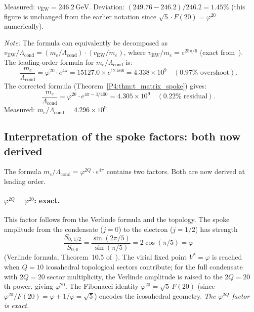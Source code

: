 \documentclass[11pt,a4paper]{article}
\theoremstyle{definition}
\theoremstyle{remark}
\newcommand{\vp}{\varphi}
\newcommand{\vEW}{v_{\mathrm{EW}}}
\newcommand{\Lcond}{\Lambda_{\mathrm{cond}}}
\begin{document}
Measured: $\vEW = 246.2\,\mathrm{GeV}$.  Deviation: $(249.76-246.2)/246.2 = 1.45\%$
(this figure is unchanged from the earlier notation since
$\sqrt{5}\cdot F(20) = \vp^{20}$ numerically).

\medskip
\noindent
\textit{Note:} The formula can equivalently be decomposed as
$v_\text{EW}/\Lcond = (m_e/\Lcond)\cdot(v_\text{EW}/m_e)$, where
$v_\text{EW}/m_e = e^{25\pi/6}$ (exact from~\cite{Paper1}).
The leading-order formula for $m_e/\Lcond$ is:
\begin{equation}
  \frac{m_e}{\Lcond} = \vp^{20}\cdot e^{4\pi}
  = 15127.0\times e^{12.566}
  = 4.338\times10^9 \quad(0.97\%\text{ overshoot}).
  \label{P4:eq:me_formula}
\end{equation}
The corrected formula (Theorem~\ref{P4:thm:t_matrix_spoke}) gives:
\begin{equation}
  \frac{m_e}{\Lcond} = \vp^{20}\cdot e^{4\pi-3/400}
  = 4.305\times10^9 \quad(0.22\%\text{ residual}).
  \label{P4:eq:me_formula_corrected}
\end{equation}
Measured: $m_e/\Lcond = 4.296\times10^9$.

\subsection{Interpretation of the spoke factors: both now derived}
\label{P4:sec:spoke_factors}

The formula $m_e/\Lcond = \vp^{2Q}\cdot e^{4\pi}$ contains two factors.
Both are now derived at leading order.

\paragraph{$\vp^{2Q} = \vp^{20}$: exact.}
This factor follows from the Verlinde formula and the topology.
The spoke amplitude from the condensate ($j=0$) to the electron ($j=1/2$)
has strength
\begin{equation}
  \frac{S_{0,\,1/2}}{S_{0,0}} = \frac{\sin(2\pi/5)}{\sin(\pi/5)} = 2\cos(\pi/5) = \vp
  \label{P4:eq:verlinde_spoke}
\end{equation}
(Verlinde formula, Theorem~10.5 of~\cite{Paper3}).  The virial fixed point
$V^*=\vp$ is reached when $Q=10$ icosahedral topological sectors contribute;
for the full condensate with $2Q=20$ sector multiplicity,
the Verlinde amplitude is raised to the $2Q=20$th power, giving $\vp^{20}$.
The Fibonacci identity $\vp^{20} = \sqrt{5}\,F(20)$ (since
$\vp^{20}/F(20) = \vp+1/\vp = \sqrt{5}$) encodes the icosahedral geometry.
\emph{The $\vp^{2Q}$ factor is exact.}
\end{document}
